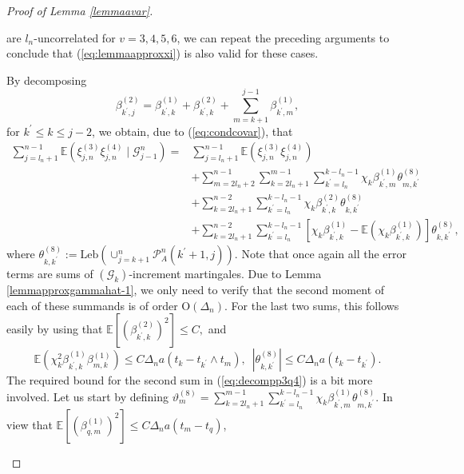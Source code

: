 \documentclass{article}
\theoremstyle{plain}
\theoremstyle{definition}
\theoremstyle{remark}
\newcommand{\Leb}{\ensuremath{\mathrm{Leb}}}
\begin{document}
\begin{appendix}
\begin{proof}[Proof of Lemma \ref{lemmaavar}]
\begin{description}
		are $l_{n}$-uncorrelated for $v=3,4,5,6$, we can repeat the preceding
		arguments to conclude that (\ref{eq:lemmaapproxxi}) is also valid
		for these cases.
		\item [{$p=3$:}] By decomposing 
		\begin{equation}
			\beta_{k^{\prime},j}^{(2)}=\beta_{k^{\prime},k}^{(1)}+\beta_{k^{\prime},k}^{(2)}+\sum_{m=k+1}^{j-1}\beta_{k^{\prime},m}^{(1)},\label{eq:decompp34}
		\end{equation}
		for $k^{\prime}\leq k\leq j-2$, we obtain, due to (\ref{eq:condcovar}),
		that 
		\begin{equation}
			\begin{aligned}\sum_{j=l_{n}+1}^{n-1}\mathbb{E}(\xi_{j,n}^{(3)}\xi_{j,n}^{(4)}\mid\mathscr{G}_{j-1}^{n})= & \sum_{j=l_{n}+1}^{n-1}\mathbb{E}(\xi_{j,n}^{(3)}\xi_{j,n}^{(4)})\\
				& +\sum_{m=2l_{n}+2}^{n-1}\sum_{k=2l_{n}+1}^{m-1}\sum_{k^{\prime}=l_{n}}^{k-l_{n}-1}\chi_{k}\beta_{k^{\prime},m}^{(1)}\theta_{m,k^{\prime}}^{(8)}\\
				& +\sum_{k=2l_{n}+1}^{n-2}\sum_{k^{\prime}=l_{n}}^{k-l_{n}-1}\chi_{k}\beta_{k^{\prime},k}^{(2)}\theta_{k,k^{\prime}}^{(8)}\\
				& +\sum_{k=2l_{n}+1}^{n-2}\sum_{k^{\prime}=l_{n}}^{k-l_{n}-1}[\chi_{k}\beta_{k^{\prime},k}^{(1)}-\mathbb{E}(\chi_{k}\beta_{k^{\prime},k}^{(1)})]\theta_{k,k^{\prime}}^{(8)},
			\end{aligned}
			\label{eq:decompp3q4}
		\end{equation}
		where $\theta_{k,k^{\prime}}^{(8)}:=\Leb(\cup_{j=k+1}^{n}\mathcal{P}_{A}^{n}(k^{\prime}+1,j)).$
		Note that once again all the error terms are sums of $(\mathscr{G}_{k})$-increment
		martingales. Due to Lemma \ref{lemmapproxgammahat-1}, we only need to verify
		that the second moment of each of these summands is of order $\mathrm{O}(\Delta_{n})$.
		For the last two sums, this follows easily by using that $\mathbb{E}[(\beta_{k^{\prime},k}^{(2)})^{2}]\leq C,$
		and
		\[
		\mathbb{E}(\chi_{k}^{2}\beta_{k^{\prime},k}^{(1)}\beta_{m,k}^{(1)})\leq C\Delta_{n}a(t_{k}-t_{k^{\prime}}\land t_{m}),\,\,\,\left|\theta_{k,k^{\prime}}^{(8)}\right|\leq C\Delta_{n}a(t_{k}-t_{k^{\prime}}).
		\]
		The required bound for the second sum in (\ref{eq:decompp3q4}) is
		a bit more involved. Let us start by defining  $\vartheta_{m}^{(8)}=\sum_{k=2l_{n}+1}^{m-1}\sum_{k^{\prime}=l_{n}}^{k-l_{n}-1}\chi_{k}\beta_{k^{\prime},m}^{(1)}\theta_{m,k^{\prime}}^{(8)}$.
		In view that $\mathbb{E}[(\beta_{q,m}^{(1)})^{2}]\leq C\Delta_{n}a(t_{m}-t_{q})$,

\end{description}
\end{proof}
\end{appendix}
\end{document}
